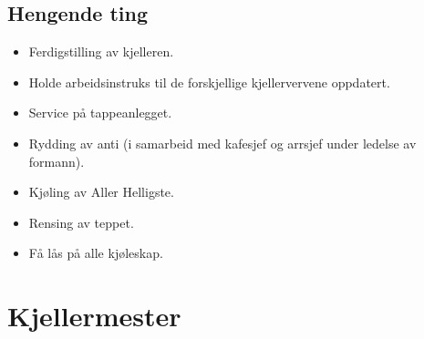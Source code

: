 \subsection{Hengende ting}
\begin{itemize}
\item Ferdigstilling av kjelleren.
\item Holde arbeidsinstruks til de forskjellige kjellervervene oppdatert.
\item Service på tappeanlegget.
\item Rydding av anti (i samarbeid med kafesjef og arrsjef under ledelse av formann).
\item Kjøling av Aller Helligste.
\item Rensing av teppet.
\item Få lås på alle kjøleskap.
\end{itemize}
\section{Kjellermester}


